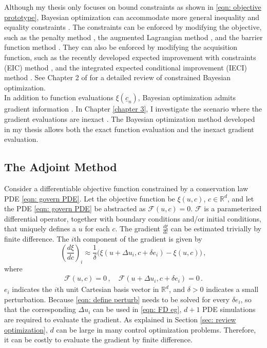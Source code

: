 Although my thesis only focuses on bound constraints as shown in \eqref{eqn: objective prototype}, 
Bayesian optimization can accommodate more general inequality and equality 
constraints \cite{PhD review constraint}. The constraints can be enforced by modifying the objective, such as
the penalty method \cite{penalty method}, the augmented Lagrangian method
\cite{augmented lagrangian method}, and the barrier function method \cite{barrier method}.
They can also be enforced by modifying the acquisition function, such as the
recently developed expected improvement with constraints (EIC) method \cite{EIC},
and the integrated expected conditional improvement (IECI) method \cite{IECI}.
See Chapter 2 of \cite{PhD review constraint} 
for a detailed review of constrained Bayesian optimization.\\

In addition to function evaluations $\xi(\underline{c}_n)$, Bayesian optimization
admits gradient information \cite{derivative RKHS, grad coKriging}. In Chapter \ref{chapter 3},
I investigate the scenario where the gradient
evaluations are inexact \cite{KennedyOhagan2}.
The Bayesian optimization method developed in my thesis 
allows both the exact function evaluation and the inexact gradient evaluation.\\

\subsection{The Adjoint Method}
Consider a differentiable objective function constrained by a conservation law PDE 
\eqref{eqn: govern PDE}.
Let the objective function be $\xi(u,c)$, $c\in \mathbb{R}^d$, 
and let the PDE \eqref{eqn: govern PDE} be abstracted
as $\mathcal{F}(u,c) = 0$. 
$\mathcal{F}$ is a parameterized differential operator, 
together with boundary conditions and/or initial conditions, that uniquely defines a $u$ for each $c$.
The gradient $\frac{d\xi}{dc}$ can be estimated trivially by finite difference. The
$i$th component of the gradient is given by
\begin{equation}
    \left(\frac{d\xi}{dc}\right)_i \approx \frac{1}{\delta} \big( 
    \xi(u+ \Delta u_i, c+\delta e_i) - \xi(u, c) \big)\,,
    \label{eqn: FD eg}
\end{equation}
where
\begin{equation}\begin{split}
    \mathcal{F}(u,c)=0\,, \quad \mathcal{F}(u+\Delta u_i, c+ \delta e_i) = 0\,.
\end{split}
\label{eqn: define perturb}
\end{equation}
$e_i$ indicates the $i$th unit Cartesian basis vector in $\mathbb{R}^d$, and $\delta>0$ indicates
a small perturbation. 
Because \eqref{eqn: define perturb} needs to be solved for every $\delta e_i$, 
so that the corresponding $\Delta u_i$ can be used in \eqref{eqn: FD eg},
$d+1$ PDE simulations are required to evaluate the gradient.
As explained in Section \ref{sec: review optimization}, $d$ can be large in many
control optimization problems. Therefore, it can be costly to evaluate the gradient 
by finite difference.\\

